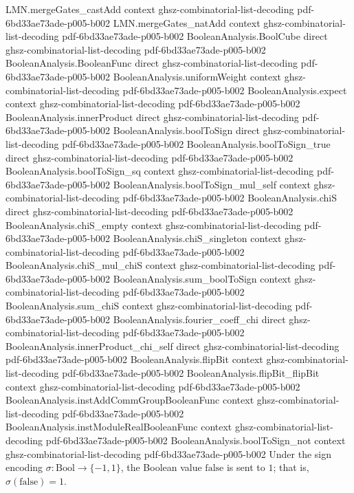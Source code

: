 \begin{lemma}
\proofstep
  {LMN.mergeGates_castAdd}
  {context}
  {ghsz-combinatorial-list-decoding}
  {pdf-6bd33ae73ade-p005-b002}
\proofstep
  {LMN.mergeGates_natAdd}
  {context}
  {ghsz-combinatorial-list-decoding}
  {pdf-6bd33ae73ade-p005-b002}
\proofstep
  {BooleanAnalysis.BoolCube}
  {direct}
  {ghsz-combinatorial-list-decoding}
  {pdf-6bd33ae73ade-p005-b002}
\proofstep
  {BooleanAnalysis.BooleanFunc}
  {direct}
  {ghsz-combinatorial-list-decoding}
  {pdf-6bd33ae73ade-p005-b002}
\proofstep
  {BooleanAnalysis.uniformWeight}
  {context}
  {ghsz-combinatorial-list-decoding}
  {pdf-6bd33ae73ade-p005-b002}
\proofstep
  {BooleanAnalysis.expect}
  {context}
  {ghsz-combinatorial-list-decoding}
  {pdf-6bd33ae73ade-p005-b002}
\proofstep
  {BooleanAnalysis.innerProduct}
  {direct}
  {ghsz-combinatorial-list-decoding}
  {pdf-6bd33ae73ade-p005-b002}
\proofstep
  {BooleanAnalysis.boolToSign}
  {direct}
  {ghsz-combinatorial-list-decoding}
  {pdf-6bd33ae73ade-p005-b002}
\proofstep
  {BooleanAnalysis.boolToSign_true}
  {direct}
  {ghsz-combinatorial-list-decoding}
  {pdf-6bd33ae73ade-p005-b002}
\proofstep
  {BooleanAnalysis.boolToSign_sq}
  {context}
  {ghsz-combinatorial-list-decoding}
  {pdf-6bd33ae73ade-p005-b002}
\proofstep
  {BooleanAnalysis.boolToSign_mul_self}
  {context}
  {ghsz-combinatorial-list-decoding}
  {pdf-6bd33ae73ade-p005-b002}
\proofstep
  {BooleanAnalysis.chiS}
  {direct}
  {ghsz-combinatorial-list-decoding}
  {pdf-6bd33ae73ade-p005-b002}
\proofstep
  {BooleanAnalysis.chiS_empty}
  {context}
  {ghsz-combinatorial-list-decoding}
  {pdf-6bd33ae73ade-p005-b002}
\proofstep
  {BooleanAnalysis.chiS_singleton}
  {context}
  {ghsz-combinatorial-list-decoding}
  {pdf-6bd33ae73ade-p005-b002}
\proofstep
  {BooleanAnalysis.chiS_mul_chiS}
  {context}
  {ghsz-combinatorial-list-decoding}
  {pdf-6bd33ae73ade-p005-b002}
\proofstep
  {BooleanAnalysis.sum_boolToSign}
  {context}
  {ghsz-combinatorial-list-decoding}
  {pdf-6bd33ae73ade-p005-b002}
\proofstep
  {BooleanAnalysis.sum_chiS}
  {context}
  {ghsz-combinatorial-list-decoding}
  {pdf-6bd33ae73ade-p005-b002}
\proofstep
  {BooleanAnalysis.fourier_coeff_chi}
  {direct}
  {ghsz-combinatorial-list-decoding}
  {pdf-6bd33ae73ade-p005-b002}
\proofstep
  {BooleanAnalysis.innerProduct_chi_self}
  {direct}
  {ghsz-combinatorial-list-decoding}
  {pdf-6bd33ae73ade-p005-b002}
\proofstep
  {BooleanAnalysis.flipBit}
  {context}
  {ghsz-combinatorial-list-decoding}
  {pdf-6bd33ae73ade-p005-b002}
\proofstep
  {BooleanAnalysis.flipBit_flipBit}
  {context}
  {ghsz-combinatorial-list-decoding}
  {pdf-6bd33ae73ade-p005-b002}
\proofstep
  {BooleanAnalysis.instAddCommGroupBooleanFunc}
  {context}
  {ghsz-combinatorial-list-decoding}
  {pdf-6bd33ae73ade-p005-b002}
\proofstep
  {BooleanAnalysis.instModuleRealBooleanFunc}
  {context}
  {ghsz-combinatorial-list-decoding}
  {pdf-6bd33ae73ade-p005-b002}
\proofstep
  {BooleanAnalysis.boolToSign_not}
  {context}
  {ghsz-combinatorial-list-decoding}
  {pdf-6bd33ae73ade-p005-b002}
Under the sign encoding $\sigma\colon\mathrm{Bool}\to\{-1,1\}$, the Boolean value
$\mathrm{false}$ is sent to $1$; that is, $\sigma(\mathrm{false}) = 1$.


\end{lemma}
